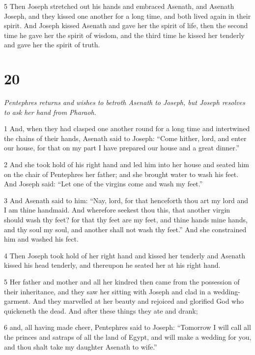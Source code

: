 \par 5 Then Joseph stretched out his hands and embraced Asenath, and Asenath Joseph, and they kissed one another for a long time, and both lived again in their spirit. And Joseph kissed Asenath and gave her the spirit of life, then the second time he gave her the spirit of wisdom, and the third time he kissed her tenderly and gave her the spirit of truth. 

\chapter{20}

\par \textit{Pentephres returns and wishes to betroth Asenath to Joseph, but Joseph resolves to ask her hand from Pharaoh.}

\par 1 And, when they had clasped one another round for a long time and intertwined the chains of their hands, Asenath said to Joseph: “Come hither, lord, and enter our house, for that on my part I have prepared our house and a great dinner.” 

\par 2 And she took hold of his right hand and led him into her house and seated him on the chair of Pentephres her father; and she brought water to wash his feet. And Joseph said: “Let one of the virgins come and wash my feet.” 

\par 3 And Asenath said to him: “Nay, lord, for that henceforth thou art my lord and I am thine handmaid. And wherefore seekest thou this, that another virgin should wash thy feet? for that thy feet are my feet, and thine hands mine hands, and thy soul my soul, and another shall not wash thy feet.” And she constrained him and washed his fect. 

\par 4 Then Joseph took hold of her right hand and kissed her tenderly and Asenath kissed his head tenderly, and thereupon he seated her at his right hand. 

\par 5 Her father and mother and all her kindred then came from the possession of their inheritance, and they saw her sitting with Joseph and clad in a wedding-garment. And they marvelled at her beauty and rejoiced and glorified God who quickeneth the dead. And after these things they ate and drank; 

\par 6 and, all having made cheer, Pentephres said to Joseph: “Tomorrow I will call all the princes and satraps of all the land of Egypt, and will make a wedding for you, and thou shalt take my daughter Asenath to wife.” 

